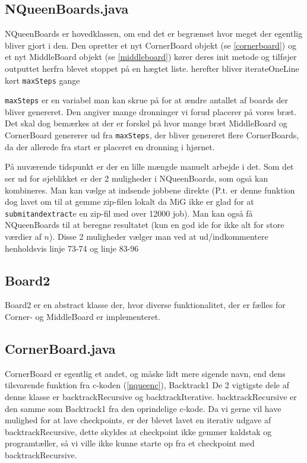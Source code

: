 \documentclass[final,a4paper,11pt]{article}
\begin{document}
\subsection{NQueenBoards.java}

NQueenBoards er hovedklassen, om end det er begrænset hvor meget der egentlig
bliver gjort i den. Den opretter et nyt CornerBoard objekt (se
\ref{cornerboard}) og et nyt MiddleBoard objekt (se \ref{middleboard})
kører deres init metode og tilføjer outputtet herfra blevet stoppet på en hægtet
liste. 
herefter bliver iterateOneLine kørt \texttt{maxSteps} gange

\texttt{maxSteps} er en variabel man kan skrue på for at
ændre antallet af boards der bliver genereret. Den angiver mange dronninger vi
forud placerer på vores bræt. Det skal dog bemærkes at der er forskel på hvor
mange bræt MiddleBoard og CornerBoard genererer ud fra \texttt{maxSteps}, der
bliver genereret flere CornerBoards, da der allerede fra start er placeret en
dronning i hjørnet.

På nuværende tidspunkt er der en lille mængde manuelt arbejde i det. Som det ser
ud for øjeblikket er der 2 muligheder i NQueenBoards, som også kan kombineres. 
Man kan vælge at indsende jobbene direkte (P.t. er denne funktion dog lavet om
til at gemme zip-filen lokalt da MiG ikke er glad for at \texttt{submitandextract}e en
zip-fil med over 12000 job). Man kan også få NQueenBoards til at beregne
resultatet (kun en god ide for ikke alt for store værdier af $n$). Disse 2
muligheder vælger man ved at ud/indkommentere henholdsvis linje 73-74 og linje
83-96 

\subsection{Board2}

Board2 er en abstract klasse der, hvor diverse funktionalitet, der er fælles for
Corner- og MiddleBoard er implementeret.

\subsection{CornerBoard.java}
\label{impcornerboard}

CornerBoard er egentlig et andet, og måske lidt mere sigende navn, end dens
tilsvarende funktion fra c-koden (\ref{nqueenc}), Backtrack1 De 2 vigtigste
dele af denne klasse er backtrackRecursive og backtrackIterative.
backtrackRecursive er den samme som Backtrack1 fra den oprindelige c-kode. Da vi
gerne vil have mulighed for at lave checkpoints, er der blevet lavet en iterativ
udgave af backtrackRecursive, dette skyldes at checkpoint ikke gemmer kaldstak
og programtæller, så vi ville ikke kunne starte op fra et checkpoint med
backtrackRecursive. 
\end{document}
